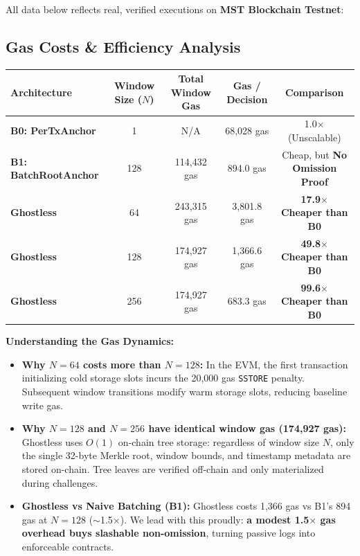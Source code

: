 \documentclass[11pt,a4paper]{article}
\begin{document}
All data below reflects real, verified executions on \textbf{MST Blockchain Testnet}:

\subsection{Gas Costs \& Efficiency Analysis}
\begin{table}[h!]
\small
\centering
\begin{tabularx}{\textwidth}{lcccc}
\toprule
\textbf{Architecture} & \textbf{Window Size ($N$)} & \textbf{Total Window Gas} & \textbf{Gas / Decision} & \textbf{Comparison} \\
\midrule
\textbf{B0: PerTxAnchor} & 1 & N/A & 68,028 gas & 1.0$\times$ (Unscalable) \\
\textbf{B1: BatchRootAnchor} & 128 & 114,432 gas & 894.0 gas & Cheap, but \textbf{No Omission Proof} \\
\textbf{Ghostless} & 64 & 243,315 gas & 3,801.8 gas & \textbf{17.9$\times$ Cheaper than B0} \\
\textbf{Ghostless} & 128 & 174,927 gas & 1,366.6 gas & \textbf{49.8$\times$ Cheaper than B0} \\
\textbf{Ghostless} & 256 & 174,927 gas & 683.3 gas & \textbf{99.6$\times$ Cheaper than B0} \\
\bottomrule
\end{tabularx}
\end{table}

\noindent \textbf{Understanding the Gas Dynamics:}
\begin{itemize}[leftmargin=1.5em]
    \item \textbf{Why $N=64$ costs more than $N=128$:} In the EVM, the first transaction initializing cold storage slots incurs the 20,000 gas \texttt{SSTORE} penalty. Subsequent window transitions modify warm storage slots, reducing baseline write gas.
    \item \textbf{Why $N=128$ and $N=256$ have identical window gas (174,927 gas):} Ghostless uses $O(1)$ on-chain tree storage: regardless of window size $N$, only the single 32-byte Merkle root, window bounds, and timestamp metadata are stored on-chain. Tree leaves are verified off-chain and only materialized during challenges.
    \item \textbf{Ghostless vs Naive Batching (B1):} Ghostless costs 1,366 gas vs B1's 894 gas at $N=128$ ($\sim$1.5$\times$). We lead with this proudly: \textbf{a modest 1.5$\times$ gas overhead buys slashable non-omission}, turning passive logs into enforceable contracts.
\end{itemize}
\end{document}
